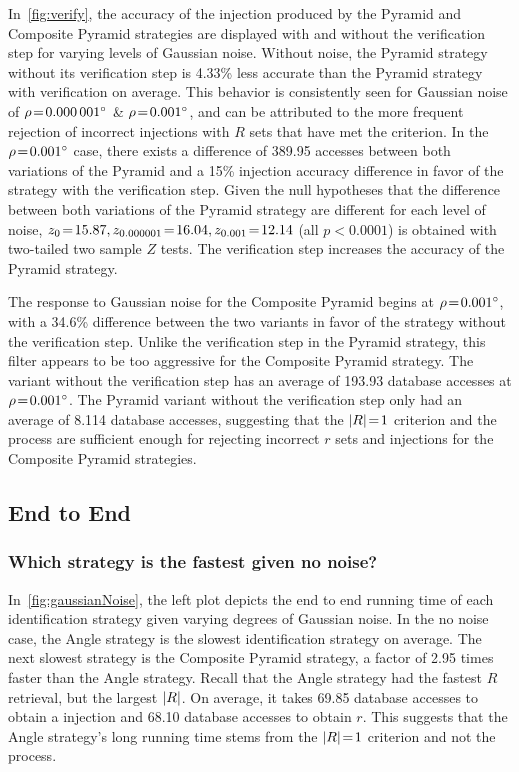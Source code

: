 In~\autoref{fig:verify}, the accuracy of the injection produced by the Pyramid and Composite Pyramid strategies are
displayed with and without the verification step for varying levels of Gaussian noise.
Without noise, the Pyramid strategy without its verification step is 4.33\% less accurate than the Pyramid strategy with
verification on average.
This behavior is consistently seen for Gaussian noise of $\rho\!=\!\ang{0.000001}$ \& $\rho\!=\!\ang{0.001}$, and
can be attributed to the more frequent rejection of incorrect injections with $R$ sets that have met the criterion.
In the $\rho\!=\!\ang{0.001}$ case, there exists a difference of 389.95 accesses between both variations of the Pyramid
and a 15\% injection accuracy difference in favor of the strategy with the verification step.
Given the null hypotheses that the difference between both variations of the Pyramid strategy are different for each
level of noise, $z_0 \!=\! 15.87, z_{0.000001} \!=\! 16.04, z_{0.001} \!=\! 12.14$ (all $p\!<\!0.0001$) is obtained with
two-tailed two sample $Z$ tests.
The verification step increases the accuracy of the Pyramid strategy.

The response to Gaussian noise for the Composite Pyramid begins at $\rho\!=\!\ang{0.001}$, with a 34.6\% difference
between the two variants in favor of the strategy without the verification step.
Unlike the verification step in the Pyramid strategy, this filter appears to be too aggressive for the Composite Pyramid
strategy.
The variant without the verification step has an average of 193.93 database accesses at $\rho\!=\!\ang{0.001}$.
The Pyramid variant without the verification step only had an average of 8.114 database accesses, suggesting that the
$\left| R \right| \!=\! 1$ criterion and the  process are sufficient enough for rejecting incorrect $r$ sets and
injections for the Composite Pyramid strategies.

\subsection{End to End}\label{subsec:endToEndEvaluation}
\subsubsection{Which strategy is the fastest given no noise?}
In~\autoref{fig:gaussianNoise}, the left plot depicts the end to end running time of each identification strategy given
varying degrees of Gaussian noise.
In the no noise case, the Angle strategy is the slowest identification strategy on average.
The next slowest strategy is the Composite Pyramid strategy, a factor of 2.95 times faster than the Angle strategy.
Recall that the Angle strategy had the fastest $R$ retrieval, but the largest $\left| R \right|$.
On average, it takes 69.85 database accesses to obtain a injection and 68.10 database accesses to obtain $r$.
This suggests that the Angle strategy's long running time stems from the $\left| R \right| \!=\! 1$ criterion and not the
 process.

